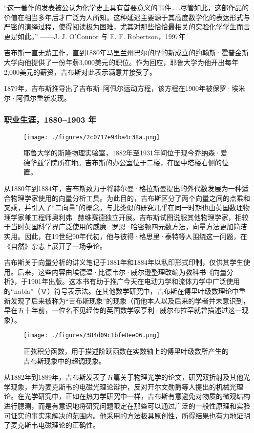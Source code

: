 “这一著作的发表被公认为化学史上具有首要意义的事件……尽管如此，这部作品的价值在相当多年后才广泛为人所知。这种延迟主要源于其高度数学化的表达形式与严密的演绎过程，使得阅读极为困难，尤其对那些恰恰最相关的实验化学学生而言更是如此。”
——J. J. O'Connor 与 E. F. Robertson，1997年

吉布斯一直无薪工作，直到1880年马里兰州巴尔的摩的新成立的约翰斯·霍普金斯大学向他提供了一份年薪3,000美元的职位。作为回应，耶鲁大学为他开出每年2,000美元的薪资，吉布斯对此表示满意并接受了。

1879年，吉布斯推导出了吉布斯–阿佩尔运动方程，该方程在1900年被保罗·埃米尔·阿佩尔重新发现。
\subsubsection{职业生涯，1880–1903 年}
\begin{figure}[ht]
\centering
\texttt{[image: ./figures/2c0717e94ba4c38a.png]}
\caption{耶鲁大学的斯隆物理实验室，1882年至1931年间位于现今乔纳森·爱德华兹学院所在地。吉布斯的办公室位于二楼，在图中塔楼右侧的位置。} \label{fig_QSY_4}
\end{figure}
从1880年到1884年，吉布斯致力于将赫尔曼·格拉斯曼提出的外代数发展为一种适合物理学家使用的向量分析工具。为此目的，吉布斯区分了两个向量之间的点乘和叉乘，并引入了“二向量”的概念。与此类似的研究几乎在同一时期也由英国数理物理学家兼工程师奥利弗·赫维赛德独立开展。吉布斯试图说服其他物理学家，相较于当时英国科学界广泛使用的威廉·罗恩·哈密顿四元数方法，向量方法更加简洁实用。因此，在19世纪90年代初，他与彼得·格思里·泰特等人围绕这一问题，在《自然》杂志上展开了一场争论。

吉布斯关于向量分析的讲义笔记于1881年和1884年以私印形式印制，仅供其学生使用。后来，这些内容由埃德温·比德韦尔·威尔逊整理改编为教科书《向量分析》，于1901年出版。这本书有助于推广今天在电动力学和流体力学中广泛使用的“nabla”（∇）符号表示法。在其他数学研究中，吉布斯在傅里叶级数理论中重新发现了后来被称为“吉布斯现象”的现象（而他本人以及后来的学者并未意识到，早在五十年前，一位名不见经传的英国数学家亨利·威尔布拉罕就曾描述过这一现象）。
\begin{figure}[ht]
\centering
\texttt{[image: ./figures/384d09c1bfe8ee06.png]}
\caption{正弦积分函数，用于描述阶跃函数在实数轴上的傅里叶级数所产生的吉布斯现象中的超调现象。} \label{fig_QSY_5}
\end{figure}
从1882年到1889年，吉布斯发表了五篇关于物理光学的论文，研究双折射及其他光学现象，并为麦克斯韦的电磁光理论辩护，反对开尔文勋爵等人提出的机械光理论。在光学研究中，正如在热力学研究中一样，吉布斯有意避免对物质的微观结构进行臆测，而是有意识地将研究问题限定在那些可以通过广泛的一般性原理和实验可证实的事实来解决的范围内。他采用的方法极具原创性，所得结果也有力地证明了麦克斯韦电磁理论的正确性。

